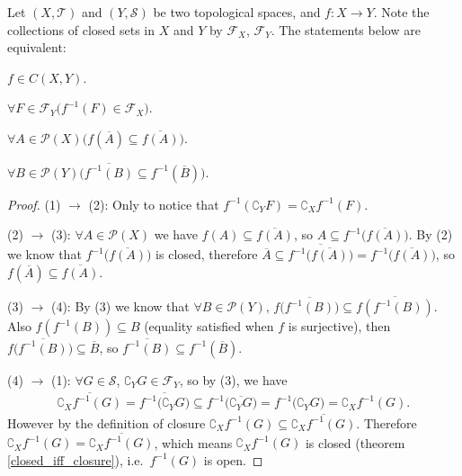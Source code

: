 \documentclass[openany]{book}
\begin{document}
\begin{theorem}
Let $(X, \mathscr T)$ and $(Y,\mathscr S)$ be two topological spaces, and $f\colon X\to Y$. Note the collections of closed sets in $X$ and $Y$ by $\mathscr F_X$, $\mathscr F_Y$.
The statements below are equivalent:
\begin{conditionlist}[label=(\arabic*)]
\item $f\in C(X,Y)$.
\item $\forall F\in\mathscr F_Y \big(
	f^{-1} (F) \in \mathscr F_X\big)$.
\item $\forall A\in \mathscr P(X) \big(
	f(\overline A) \subseteq \overline{ f(A)}\big)$.
\item $\forall B\in \mathscr P(Y) \big(
	\overline{f^{-1} (B)}\subseteq f^{-1} (\overline B) \big)$.
\end{conditionlist} 
\end{theorem}
\begin{proof}
(1) $\to$ (2): Only to notice that $f^{-1} (\complement_Y F ) =\complement_X f^{-1} (F)$. 

(2) $\to$ (3): $\forall A \in \mathscr P(X)$ we have $f(A) \subseteq \overline{f(A)}$, so $A \subseteq f^{-1} \big(
	\overline{f(A)}\big)$. 
By (2) we know that $f^{-1} \big(\overline{f(A)}\big)$ is closed, therefore 
$\overline A \subseteq \overline{f^{-1} \big(\overline{f(A)}\big)} 
	= f^{-1} \big(\overline{f(A)}\big)$, so $f(\overline A) \subseteq \overline {f(A)}$.
	
(3) $\to$ (4): By (3) we know that $\forall B\in \mathscr P(Y)$, 
$f\big(\overline{f^{-1}(B)}\big) \subseteq \overline{f(f^{-1}(B))}$. 
Also $f(f^{-1}(B)) \subseteq B$ (equality satisfied when $f$ is surjective), 
then $f\big(\overline{f^{-1}(B)}\big) \subseteq \overline B$, 
so $\overline{f^{-1}(B)} \subseteq f^{-1} (\overline B)$.

(4) $\to$ (1): $\forall G\in \mathscr S$, $\complement_Y G \in \mathscr F_Y$, so by (3), we have
\begin{align*}
	\overline {\complement_X f^{-1}(G)} =\overline {f^{-1}\big(\complement_Y G\big)} 
		\subseteq  f^{-1}\big(\overline{\complement_Y G}\big) = f^{-1}\big(\complement_Y G\big)
			=\complement_X f^{-1}(G).
\end{align*}
However by the definition of closure $\complement_X f^{-1}(G) \subseteq \overline {\complement_X f^{-1}(G)}$.
Therefore $\complement_X f^{-1}(G) = \overline {\complement_X f^{-1}(G)}$, which means $\complement_X f^{-1}(G)$ is closed (theorem \ref{closed_iff_closure}), i.e.\ $f^{-1}(G)$ is open. 
\end{proof}
\end{document}
